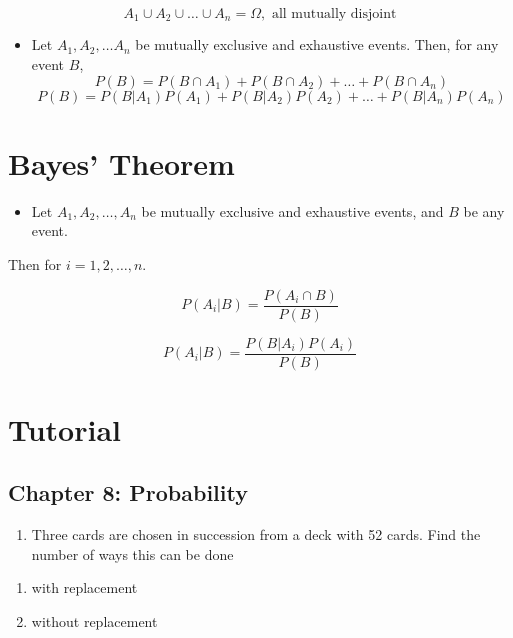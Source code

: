 \documentclass[]{book}
\providecommand{\tightlist}{%
  \setlength{\itemsep}{0pt}\setlength{\parskip}{0pt}}
\begin{document}
\[A_1\cup A_2\cup \dots \cup A_n = \Omega, \text{ all mutually disjoint}\]

\begin{itemize}
\tightlist
\item
  Let \(A_1, A_2, \dots A_n\) be mutually exclusive and exhaustive events. Then, for any event \(B\),
  \[P(B) = P(B \cap A_1) + P(B \cap A_2) + \dots + P(B \cap A_n)\]
  \[P(B) = P(B|A_1) P(A_1) + P(B|A_2) P(A_2) +\dots+ P(B|A_n) P(A_n)\]
\end{itemize}

\hypertarget{bayes-theorem}{%
\section{Bayes' Theorem}\label{bayes-theorem}}

\begin{itemize}
\tightlist
\item
  Let \(A_1, A_2, \dots,A_n\) be mutually exclusive and exhaustive events, and \(B\) be any event.
\end{itemize}

Then for \(i = 1, 2, \dots, n\).

\[P(A_i|B) = \frac{P(A_i \cap B)}{P(B)}\]

\[P(A_i|B) = \frac{P(B|A_i)P(A_i)}{P(B)}\]

\newpage

\hypertarget{tutorial-6}{%
\section{Tutorial}\label{tutorial-6}}

\hypertarget{chapter-8-probability}{%
\subsection*{Chapter 8: Probability}\label{chapter-8-probability}}

\begin{enumerate}
\def\labelenumi{\arabic{enumi}.}
\tightlist
\item
  Three cards are chosen in succession from a deck with 52 cards. Find the number of ways this can be done
\end{enumerate}

\begin{enumerate}
\def\labelenumi{(\alph{enumi})}
\tightlist
\item
  with replacement
\item
  without replacement
\end{enumerate}
\end{document}
